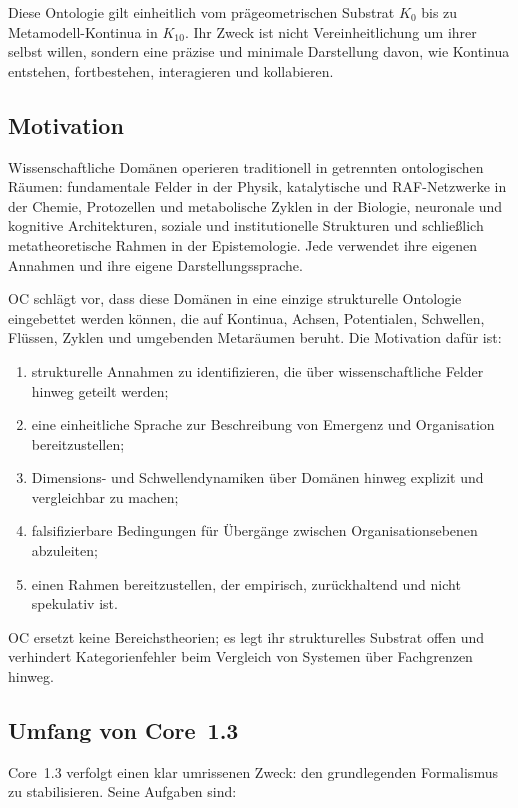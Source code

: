 Diese Ontologie gilt einheitlich vom prägeometrischen Substrat \(K_0\) bis zu Metamodell-Kontinua in \(K_{10}\). Ihr Zweck ist nicht Vereinheitlichung um ihrer selbst willen, sondern eine präzise und minimale Darstellung davon, wie Kontinua entstehen, fortbestehen, interagieren und kollabieren.

\subsection{Motivation}

Wissenschaftliche Domänen operieren traditionell in getrennten ontologischen Räumen: fundamentale Felder in der Physik, katalytische und RAF-Netzwerke in der Chemie, Protozellen und metabolische Zyklen in der Biologie, neuronale und kognitive Architekturen, soziale und institutionelle Strukturen und schließlich metatheoretische Rahmen in der Epistemologie. Jede verwendet ihre eigenen Annahmen und ihre eigene Darstellungssprache.

OC schlägt vor, dass diese Domänen in eine einzige strukturelle Ontologie eingebettet werden können, die auf Kontinua, Achsen, Potentialen, Schwellen, Flüssen, Zyklen und umgebenden Metaräumen beruht. Die Motivation dafür ist:

\begin{enumerate}
    \item strukturelle Annahmen zu identifizieren, die über wissenschaftliche Felder hinweg geteilt werden;
    \item eine einheitliche Sprache zur Beschreibung von Emergenz und Organisation bereitzustellen;
    \item Dimensions- und Schwellendynamiken über Domänen hinweg explizit und vergleichbar zu machen;
    \item falsifizierbare Bedingungen für Übergänge zwischen Organisationsebenen abzuleiten;
    \item einen Rahmen bereitzustellen, der empirisch, zurückhaltend und nicht spekulativ ist.
\end{enumerate}

OC ersetzt keine Bereichstheorien; es legt ihr strukturelles Substrat offen und verhindert Kategorienfehler beim Vergleich von Systemen über Fachgrenzen hinweg.

\subsection{Umfang von Core~1.3}

Core~1.3 verfolgt einen klar umrissenen Zweck: den grundlegenden Formalismus zu stabilisieren. Seine Aufgaben sind:

